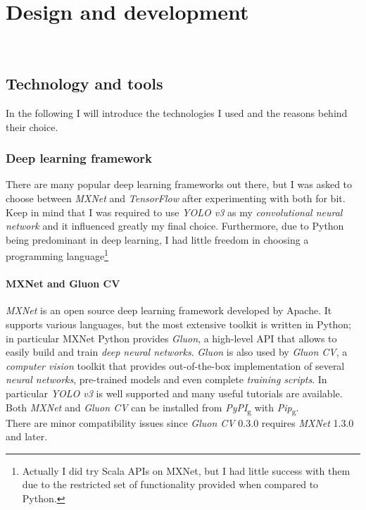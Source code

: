 
\chapter{Design and development}
\label{cap:design-development}

\\

\section{Technology and tools}
\label{sec:technology-tools}

In the following I will introduce the technologies I used and the reasons behind their choice.

\subsection*{Deep learning framework}
There are many popular deep learning frameworks out there, but I was asked to choose between \emph{MXNet} and \emph{TensorFlow} after experimenting with both for bit. Keep in mind that I was required to use \emph{YOLO v3} as my \emph{convolutional neural network} and it influenced greatly my final choice. Furthermore, due to Python being predominant in deep learning, I had little freedom in choosing a programming language\footnote{Actually I did try Scala APIs on MXNet, but I had little success with them due to the restricted set of functionality provided when compared to Python.}

\subsubsection*{MXNet and Gluon CV}
\emph{MXNet} is an open source deep learning framework developed by Apache. It supports various languages, but the most extensive toolkit is written in Python; in particular MXNet Python provides \emph{Gluon}, a high-level API that allows to easily build and train \emph{deep neural networks}. \emph{Gluon} is also used by \emph{Gluon CV}, a \emph{computer vision} toolkit that provides out-of-the-box implementation of several \emph{neural networks}, pre-trained models and even complete \emph{training scripts}. In particular \emph{YOLO v3} is well supported and many useful tutorials are available. \\
Both \emph{MXNet} and \emph{Gluon CV} can be installed from \emph{\gls{PyPI}}\textsubscript{g} with \emph{\gls{Pip}}\textsubscript{g}. \\
There are minor compatibility issues since \emph{Gluon CV} 0.3.0 requires \emph{MXNet} 1.3.0 and later.

